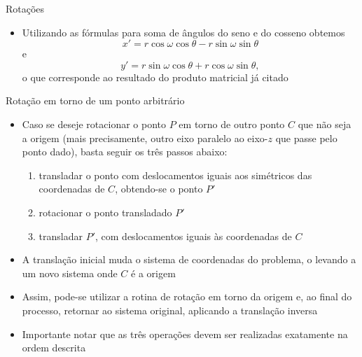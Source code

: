 \begin{frame}[fragile]{Rotações}

    \begin{itemize}
        \item Utilizando as fórmulas para soma de ângulos do seno e do cosseno obtemos
        \[
            x' = r\cos \omega\cos \theta - r\sin \omega\sin \theta
        \] e
        \[
            y' = r\sin \omega\cos \theta + r\cos \omega\sin \theta,
        \]
        o que corresponde ao resultado do produto matricial já citado 
        \pause

    \end{itemize}

\end{frame}

\begin{frame}[fragile]{Rotação em torno de um ponto arbitrário}

    \begin{itemize}
        \item Caso se deseje rotacionar o ponto $P$ em torno de outro ponto $C$ que não seja a 
            origem (mais precisamente, outro eixo paralelo ao eixo-$z$ que passe pelo ponto 
            dado), basta seguir os três passos abaixo:
        \pause

        \begin{enumerate}
            \item transladar o ponto com deslocamentos iguais aos simétricos das coordenadas de $C$, 
                obtendo-se o ponto $P'$
        \pause
            \item rotacionar o ponto transladado $P'$
        \pause
            \item transladar $P'$, com deslocamentos iguais às coordenadas de $C$
        \end{enumerate}
        \pause

        \item A translação inicial muda o sistema de coordenadas do problema, o levando a um novo 
            sistema onde $C$ é a origem
        \pause

        \item Assim, pode-se utilizar a rotina de rotação em torno da origem e, ao final do processo, retornar ao sistema original, aplicando a translação inversa
        \pause

        \item Importante notar que as três operações devem ser realizadas exatamente na ordem descrita
    \end{itemize}

\end{frame}

